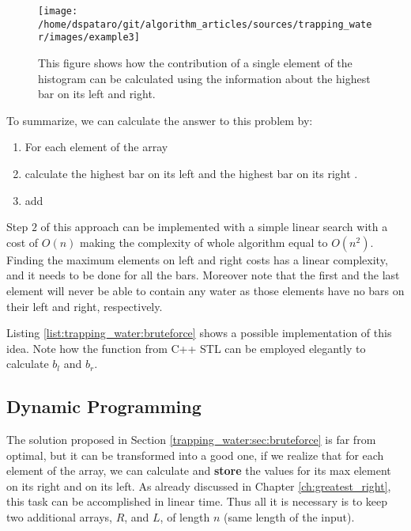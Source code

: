 \begin{figure}
		\label{fig:trapping_water_example3}
		\centering
		\texttt{[image: /home/dspataro/git/algorithm\_articles/sources/trapping\_water/images/example3]}
		\caption{This figure shows how the contribution of a single element of the histogram can be calculated using the information about the highest bar on its left and right.}
\end{figure}

To summarize, we can calculate the answer to this problem by:
\begin{enumerate}
	\item For each element of the array 
	\item calculate the highest bar on its left  and the highest bar on its right .
	\item add 
\end{enumerate}

Step $2$ of this approach can be implemented with a simple linear search with a cost of $O(n)$ making the complexity of whole algorithm equal to $O(n^2)$. Finding the maximum elements on left and right costs has a linear complexity, and it needs to be done for all the bars.
Moreover note that the first and the last element will never be able to contain any water as those elements have no bars on their left and right, respectively.

Listing \ref{list:trapping_water:bruteforce} shows a possible implementation of this idea. Note how the  function from C++ STL can be employed elegantly to calculate $b_l$ and $b_r$.





\subsection{Dynamic Programming}
\label{trapping_water:sec:dp}
The solution proposed in Section \ref{trapping_water:sec:bruteforce} is far from optimal, but it can be transformed into a good one, if we realize that
for each element of the array, we can calculate and \textbf{store} the values for its max element on its right and on its left. As already discussed in Chapter \ref{ch:greatest_right}, this task can be accomplished in linear time. Thus all it is necessary is to keep two additional arrays, $R$, and $L$, of  length $n$ (same length of the input). 


